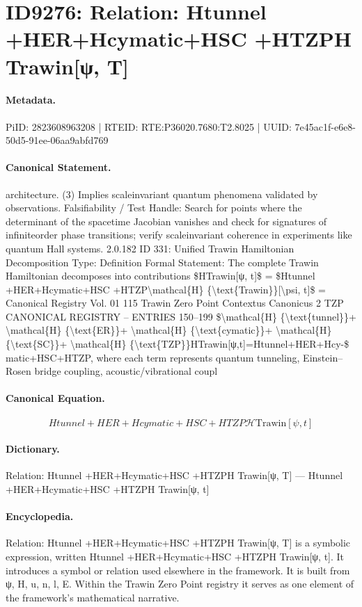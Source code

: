\section*{ID9276: Relation: Htunnel +HER+Hcymatic+HSC +HTZPH Trawin[ψ, T]}
\paragraph{Metadata.}
PiID: 2823608963208 | RTEID: RTE:P36020.7680:T2.8025 | UUID: 7e45ac1f-e6e8-50d5-91ee-06aa9abfd769

\paragraph{Canonical Statement.}
architecture. (3) Implies scaleinvariant quantum phenomena validated by observations. Falsifiability / Test Handle: Search for points where the determinant of the spacetime Jacobian vanishes and check for signatures of infiniteorder phase transitions; verify scaleinvariant coherence in experiments like quantum Hall systems. 2.0.182 ID 331: Unified Trawin Hamiltonian Decomposition Type: Definition Formal Statement: The complete Trawin Hamiltonian decomposes into contributions \$HTrawin[ψ, t]\$ = \$Htunnel +HER+Hcymatic+HSC +HTZP\textbackslash{}mathcal\{H\} \{\textbackslash{}text\{Trawin\}\}[\textbackslash{}psi, t]\$ = Canonical Registry Vol. 01 115 Trawin Zero Point Contextus Canonicus 2 TZP CANONICAL REGISTRY – ENTRIES 150–199 \$\textbackslash{}mathcal\{H\} \{\textbackslash{}text\{tunnel\}\}+ \textbackslash{}mathcal\{H\} \{\textbackslash{}text\{ER\}\}+ \textbackslash{}mathcal\{H\} \{\textbackslash{}text\{cymatic\}\}+ \textbackslash{}mathcal\{H\} \{\textbackslash{}text\{SC\}\}+ \textbackslash{}mathcal\{H\} \{\textbackslash{}text\{TZP\}\}HTrawin[ψ,t]=Htunnel+HER+Hcy-\$ matic+HSC+HTZP, where each term represents quantum tunneling, Einstein–Rosen bridge coupling, acoustic/vibrational coupl

\paragraph{Canonical Equation.}
\[
Htunnel +HER+Hcymatic+HSC +HTZP\mathcal{H} {\text{Trawin}}[\psi, t]
\]

\paragraph{Dictionary.}
Relation: Htunnel +HER+Hcymatic+HSC +HTZPH Trawin[ψ, T] — Htunnel +HER+Hcymatic+HSC +HTZPH Trawin[ψ, t]

\paragraph{Encyclopedia.}
Relation: Htunnel +HER+Hcymatic+HSC +HTZPH Trawin[ψ, T] is a symbolic expression, written Htunnel +HER+Hcymatic+HSC +HTZPH Trawin[ψ, t]. It introduces a symbol or relation used elsewhere in the framework. It is built from ψ, H, u, n, l, E. Within the Trawin Zero Point registry it serves as one element of the framework's mathematical narrative.
